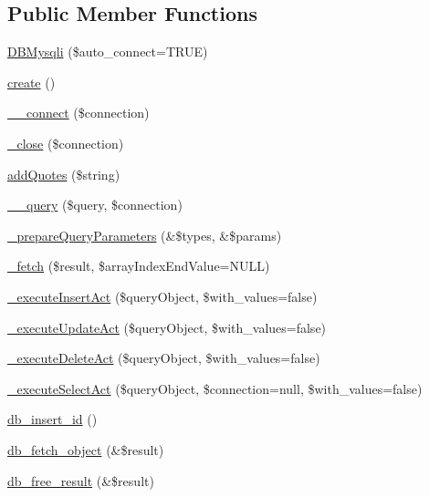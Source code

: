 \subsection*{Public Member Functions}
\begin{DoxyCompactItemize}
\item 
\hyperlink{classDBMysqli_ab3cb2172fa087e11c06968914090b71d}{D\-B\-Mysqli} (\$auto\-\_\-connect=T\-R\-U\-E)
\item 
\hyperlink{classDBMysqli_a589dd45054eb50e666c3a57815631111}{create} ()
\item 
\hyperlink{classDBMysqli_a7c041395f7926e0ec84186aa9eabc138}{\-\_\-\-\_\-connect} (\$connection)
\item 
\hyperlink{classDBMysqli_afd6324d65eaf95dbd8e6fa2f97b9b9db}{\-\_\-close} (\$connection)
\item 
\hyperlink{classDBMysqli_a29266a97d63be11763eb24926d39f544}{add\-Quotes} (\$string)
\item 
\hyperlink{classDBMysqli_aa7e47178c283abd8ba1bb7c8d0a31c66}{\-\_\-\-\_\-query} (\$query, \$connection)
\item 
\hyperlink{classDBMysqli_ab884208e90c71708faca2e56c5da0666}{\-\_\-prepare\-Query\-Parameters} (\&\$types, \&\$params)
\item 
\hyperlink{classDBMysqli_a4b5becb1ab24b99a184fe1942bc73280}{\-\_\-fetch} (\$result, \$array\-Index\-End\-Value=N\-U\-L\-L)
\item 
\hyperlink{classDBMysqli_a6a62a12cd9c46aac0242e81f58a25803}{\-\_\-execute\-Insert\-Act} (\$query\-Object, \$with\-\_\-values=false)
\item 
\hyperlink{classDBMysqli_acc5f5408c3717c88411a238e1e176785}{\-\_\-execute\-Update\-Act} (\$query\-Object, \$with\-\_\-values=false)
\item 
\hyperlink{classDBMysqli_a3dc572c5b452c7a2e0e150f6b8af622e}{\-\_\-execute\-Delete\-Act} (\$query\-Object, \$with\-\_\-values=false)
\item 
\hyperlink{classDBMysqli_a76e3f67b339c7613ad1d6e33af04e51e}{\-\_\-execute\-Select\-Act} (\$query\-Object, \$connection=null, \$with\-\_\-values=false)
\item 
\hyperlink{classDBMysqli_a080939c13758f00ecd0092eda6cd2452}{db\-\_\-insert\-\_\-id} ()
\item 
\hyperlink{classDBMysqli_a9e173fea0afa5c419977be95d1859892}{db\-\_\-fetch\-\_\-object} (\&\$result)
\item 
\hyperlink{classDBMysqli_a8639ebaca8bae119797a084af68750cc}{db\-\_\-free\-\_\-result} (\&\$result)
\end{DoxyCompactItemize}
